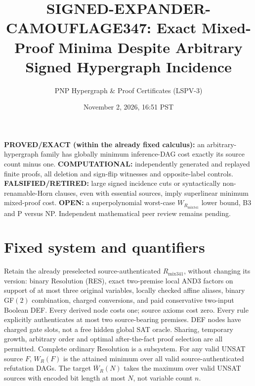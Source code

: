 \documentclass[11pt]{article}
\title{SIGNED-EXPANDER-CAMOUFLAGE347: Exact Mixed-Proof Minima Despite Arbitrary Signed Hypergraph Incidence}
\author{PNP Hypergraph \& Proof Certificates (LSPV-3)}
\date{November 2, 2026, 16:51 PST}
\begin{document}
\maketitle
\noindent\textbf{PROVED/EXACT (within the already fixed calculus):} an arbitrary-hypergraph family has globally minimum inference-DAG cost exactly its source count minus one. \textbf{COMPUTATIONAL:} independently generated and replayed finite proofs, all deletion and sign-flip witnesses and opposite-label controls. \textbf{FALSIFIED/RETIRED:} large signed incidence cuts or syntactically non-renamable-Horn clauses, even with essential sources, imply superlinear minimum mixed-proof cost. \textbf{OPEN:} a superpolynomial worst-case $W_{R_{\mathrm{mix341}}}$ lower bound, B3 and P versus NP. Independent mathematical peer review remains pending.

\section*{Fixed system and quantifiers}
Retain the already preselected source-authenticated $R_{\mathrm{mix341}}$, without changing its version: binary Resolution (RES), exact two-premise local AND3 factors on support of at most three original variables, locally checked affine aliases, binary GF$(2)$ combination, charged conversions, and paid conservative two-input Boolean DEF. Every derived node costs one; source axioms cost zero. Every rule explicitly authenticates at most two source-bearing premises. DEF nodes have charged gate slots, not a free hidden global SAT oracle. Sharing, temporary growth, arbitrary order and optimal after-the-fact proof selection are all permitted. Complete ordinary Resolution is a subsystem. For any valid UNSAT source $F$, $W_R(F)$ is the attained minimum over all valid source-authenticated refutation DAGs. The target $\overline W_R(N)$ takes the maximum over valid UNSAT sources with encoded bit length at most $N$, not variable count $n$.
\end{document}
